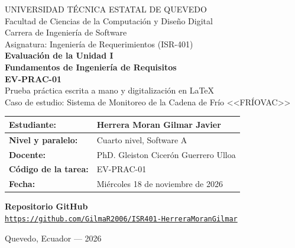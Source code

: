 \documentclass[11pt,a4paper]{article}
\begin{document}
\begin{center}
{\large UNIVERSIDAD T\'ECNICA ESTATAL DE QUEVEDO}\\[6pt]
{\normalsize Facultad de Ciencias de la Computaci\'on y Dise\~no Digital}\\[3pt]
{\normalsize Carrera de Ingenier\'ia de Software}\\[14pt]
{\normalsize Asignatura: Ingenier\'ia de Requerimientos (ISR-401)}\\[42pt]
{\LARGE\bfseries Evaluaci\'on de la Unidad I\\[4pt] Fundamentos de Ingenier\'ia de Requisitos}\\[14pt]
{\large\bfseries EV-PRAC-01}\\[14pt]
{\normalsize Prueba pr\'actica escrita a mano y digitalizaci\'on en \LaTeX}\\[8pt]
{\normalsize Caso de estudio: Sistema de Monitoreo de la Cadena de Fr\'io <<FR\'IOVAC>>}
\end{center}
\vspace{1.4cm}
\begin{tabularx}{\textwidth}{|>{\bfseries}p{4.5cm}|X|}\hline
Estudiante: & Herrera Moran Gilmar Javier \\ \hline
Nivel y paralelo: & Cuarto nivel, Software A \\ \hline
Docente: & PhD. Gleiston Cicer\'on Guerrero Ulloa \\ \hline
C\'odigo de la tarea: & EV-PRAC-01 \\ \hline
Fecha: & Mi\'ercoles 18 de noviembre de 2026 \\ \hline
\end{tabularx}
\vspace{1.3cm}
\begin{center}
{\bfseries Repositorio GitHub}\\[12pt]
\mbox{\href{https://github.com/GilmaR2006/ISR401-HerreraMoranGilmar}{\small\texttt{https://github.com/GilmaR2006/ISR401-HerreraMoranGilmar}}}
\end{center}
\vfill
\begin{center}
Quevedo, Ecuador --- 2026
\end{center}
\end{document}
